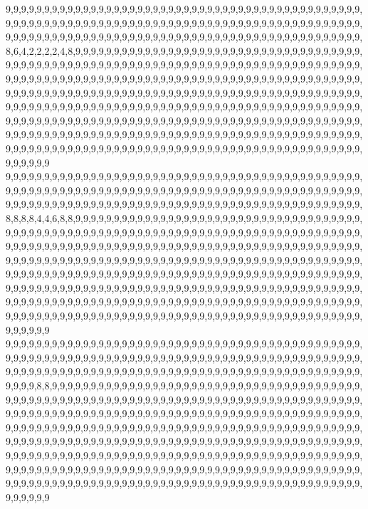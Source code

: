9,9,9,9,9,9,9,9,9,9,9,9,9,9,9,9,9,9,9,9,9,9,9,9,9,9,9,9,9,9,9,9,9,9,9,9,9,9,9,9,9,9,9,9,9,9,9,9,9,9,9,9,9,9,9,9,9,9,9,9,9,9,9,9,9,9,9,9,9,9,9,9,9,9,9,9,9,9,9,9,9,9,9,9,9,9,9,9,9,9,9,9,9,9,9,9,9,9,9,9,9,9,9,9,9,9,9,9,9,9,9,9,9,9,9,9,9,9,9,9,9,9,9,9,9,9,9,9,9,9,9,9,9,9,9,9,9,9,8,6,4,2,2,2,2,4,8,9,9,9,9,9,9,9,9,9,9,9,9,9,9,9,9,9,9,9,9,9,9,9,9,9,9,9,9,9,9,9,9,9,9,9,9,9,9,9,9,9,9,9,9,9,9,9,9,9,9,9,9,9,9,9,9,9,9,9,9,9,9,9,9,9,9,9,9,9,9,9,9,9,9,9,9,9,9,9,9,9,9,9,9,9,9,9,9,9,9,9,9,9,9,9,9,9,9,9,9,9,9,9,9,9,9,9,9,9,9,9,9,9,9,9,9,9,9,9,9,9,9,9,9,9,9,9,9,9,9,9,9,9,9,9,9,9,9,9,9,9,9,9,9,9,9,9,9,9,9,9,9,9,9,9,9,9,9,9,9,9,9,9,9,9,9,9,9,9,9,9,9,9,9,9,9,9,9,9,9,9,9,9,9,9,9,9,9,9,9,9,9,9,9,9,9,9,9,9,9,9,9,9,9,9,9,9,9,9,9,9,9,9,9,9,9,9,9,9,9,9,9,9,9,9,9,9,9,9,9,9,9,9,9,9,9,9,9,9,9,9,9,9,9,9,9,9,9,9,9,9,9,9,9,9,9,9,9,9,9,9,9,9,9,9,9,9,9,9,9,9,9,9,9,9,9,9,9,9,9,9,9,9,9,9,9,9,9,9,9,9,9,9,9,9,9,9,9,9,9,9,9,9,9,9,9,9,9,9,9,9,9,9,9,9,9,9,9,9,9,9,9,9,9,9,9,9,9,9,9,9,9,9,9,9,9,9,9,9,9,9,9,9,9,9,9,9,9,9,9,9,9,9,9,9,9,9,9,9,9,9,9,9,9,9
9,9,9,9,9,9,9,9,9,9,9,9,9,9,9,9,9,9,9,9,9,9,9,9,9,9,9,9,9,9,9,9,9,9,9,9,9,9,9,9,9,9,9,9,9,9,9,9,9,9,9,9,9,9,9,9,9,9,9,9,9,9,9,9,9,9,9,9,9,9,9,9,9,9,9,9,9,9,9,9,9,9,9,9,9,9,9,9,9,9,9,9,9,9,9,9,9,9,9,9,9,9,9,9,9,9,9,9,9,9,9,9,9,9,9,9,9,9,9,9,9,9,9,9,9,9,9,9,9,9,9,9,9,9,9,9,9,9,8,8,8,8,4,4,6,8,8,9,9,9,9,9,9,9,9,9,9,9,9,9,9,9,9,9,9,9,9,9,9,9,9,9,9,9,9,9,9,9,9,9,9,9,9,9,9,9,9,9,9,9,9,9,9,9,9,9,9,9,9,9,9,9,9,9,9,9,9,9,9,9,9,9,9,9,9,9,9,9,9,9,9,9,9,9,9,9,9,9,9,9,9,9,9,9,9,9,9,9,9,9,9,9,9,9,9,9,9,9,9,9,9,9,9,9,9,9,9,9,9,9,9,9,9,9,9,9,9,9,9,9,9,9,9,9,9,9,9,9,9,9,9,9,9,9,9,9,9,9,9,9,9,9,9,9,9,9,9,9,9,9,9,9,9,9,9,9,9,9,9,9,9,9,9,9,9,9,9,9,9,9,9,9,9,9,9,9,9,9,9,9,9,9,9,9,9,9,9,9,9,9,9,9,9,9,9,9,9,9,9,9,9,9,9,9,9,9,9,9,9,9,9,9,9,9,9,9,9,9,9,9,9,9,9,9,9,9,9,9,9,9,9,9,9,9,9,9,9,9,9,9,9,9,9,9,9,9,9,9,9,9,9,9,9,9,9,9,9,9,9,9,9,9,9,9,9,9,9,9,9,9,9,9,9,9,9,9,9,9,9,9,9,9,9,9,9,9,9,9,9,9,9,9,9,9,9,9,9,9,9,9,9,9,9,9,9,9,9,9,9,9,9,9,9,9,9,9,9,9,9,9,9,9,9,9,9,9,9,9,9,9,9,9,9,9,9,9,9,9,9,9,9,9,9,9,9,9,9,9,9,9,9,9,9,9,9,9,9,9,9,9,9,9
9,9,9,9,9,9,9,9,9,9,9,9,9,9,9,9,9,9,9,9,9,9,9,9,9,9,9,9,9,9,9,9,9,9,9,9,9,9,9,9,9,9,9,9,9,9,9,9,9,9,9,9,9,9,9,9,9,9,9,9,9,9,9,9,9,9,9,9,9,9,9,9,9,9,9,9,9,9,9,9,9,9,9,9,9,9,9,9,9,9,9,9,9,9,9,9,9,9,9,9,9,9,9,9,9,9,9,9,9,9,9,9,9,9,9,9,9,9,9,9,9,9,9,9,9,9,9,9,9,9,9,9,9,9,9,9,9,9,9,9,9,9,8,8,9,9,9,9,9,9,9,9,9,9,9,9,9,9,9,9,9,9,9,9,9,9,9,9,9,9,9,9,9,9,9,9,9,9,9,9,9,9,9,9,9,9,9,9,9,9,9,9,9,9,9,9,9,9,9,9,9,9,9,9,9,9,9,9,9,9,9,9,9,9,9,9,9,9,9,9,9,9,9,9,9,9,9,9,9,9,9,9,9,9,9,9,9,9,9,9,9,9,9,9,9,9,9,9,9,9,9,9,9,9,9,9,9,9,9,9,9,9,9,9,9,9,9,9,9,9,9,9,9,9,9,9,9,9,9,9,9,9,9,9,9,9,9,9,9,9,9,9,9,9,9,9,9,9,9,9,9,9,9,9,9,9,9,9,9,9,9,9,9,9,9,9,9,9,9,9,9,9,9,9,9,9,9,9,9,9,9,9,9,9,9,9,9,9,9,9,9,9,9,9,9,9,9,9,9,9,9,9,9,9,9,9,9,9,9,9,9,9,9,9,9,9,9,9,9,9,9,9,9,9,9,9,9,9,9,9,9,9,9,9,9,9,9,9,9,9,9,9,9,9,9,9,9,9,9,9,9,9,9,9,9,9,9,9,9,9,9,9,9,9,9,9,9,9,9,9,9,9,9,9,9,9,9,9,9,9,9,9,9,9,9,9,9,9,9,9,9,9,9,9,9,9,9,9,9,9,9,9,9,9,9,9,9,9,9,9,9,9,9,9,9,9,9,9,9,9,9,9,9,9,9,9,9,9,9,9,9,9,9,9,9,9,9,9,9,9,9,9,9,9,9,9,9,9,9,9,9,9,9,9,9,9,9,9,9,9,9,9
